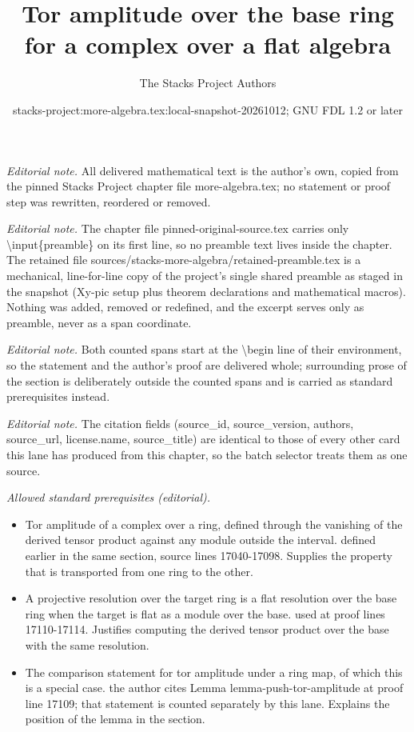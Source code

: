 \documentclass[10pt,a4paper]{amsart}
\title{Tor amplitude over the base ring for a complex over a flat algebra}
\author{The Stacks Project Authors}
\date{stacks-project:more-algebra.tex:local-snapshot-20261012; GNU FDL 1.2 or later}
\theoremstyle{plain}
\theoremstyle{definition}
\theoremstyle{remark}
\numberwithin{equation}{subsection}
\begin{document}
\maketitle
\setcounter{subsection}{1}
\noindent\textit{Editorial note.} All delivered mathematical text is the author's own, copied from the pinned Stacks Project chapter file more-algebra.tex; no statement or proof step was rewritten, reordered or removed.\par\medskip
\noindent\textit{Editorial note.} The chapter file pinned-original-source.tex carries only \textbackslash{}input\{preamble\} on its first line, so no preamble text lives inside the chapter. The retained file sources/stacks-more-algebra/retained-preamble.tex is a mechanical, line-for-line copy of the project's single shared preamble as staged in the snapshot (Xy-pic setup plus theorem declarations and mathematical macros). Nothing was added, removed or redefined, and the excerpt serves only as preamble, never as a span coordinate.\par\medskip
\noindent\textit{Editorial note.} Both counted spans start at the \textbackslash{}begin line of their environment, so the statement and the author's proof are delivered whole; surrounding prose of the section is deliberately outside the counted spans and is carried as standard prerequisites instead.\par\medskip
\noindent\textit{Editorial note.} The citation fields (source\_id, source\_version, authors, source\_url, license.name, source\_title) are identical to those of every other card this lane has produced from this chapter, so the batch selector treats them as one source.\par\medskip
\noindent\textit{Allowed standard prerequisites (editorial).}\begin{itemize}
\item Tor amplitude of a complex over a ring, defined through the vanishing of the derived tensor product against any module outside the interval. defined earlier in the same section, source lines 17040-17098. Supplies the property that is transported from one ring to the other.
\item A projective resolution over the target ring is a flat resolution over the base ring when the target is flat as a module over the base. used at proof lines 17110-17114. Justifies computing the derived tensor product over the base with the same resolution.
\item The comparison statement for tor amplitude under a ring map, of which this is a special case. the author cites Lemma lemma-push-tor-amplitude at proof line 17109; that statement is counted separately by this lane. Explains the position of the lemma in the section.
\end{itemize}\medskip
\end{document}
